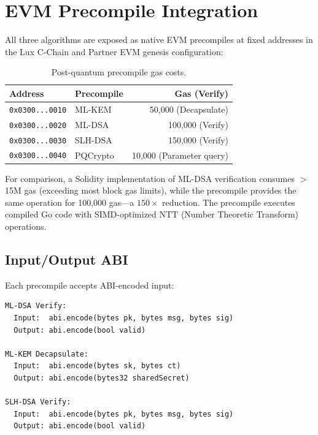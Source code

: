 \documentclass[11pt,a4paper]{article}
\begin{document}
\section{EVM Precompile Integration}
\label{sec:precompiles}

All three algorithms are exposed as native EVM precompiles at fixed
addresses in the Lux C-Chain and Partner EVM genesis configuration:

\begin{table}[h]
\centering
\begin{tabular}{llr}
\toprule
\textbf{Address} & \textbf{Precompile} & \textbf{Gas (Verify)} \\
\midrule
\texttt{0x0300...0010} & ML-KEM & 50,000 (Decapsulate) \\
\texttt{0x0300...0020} & ML-DSA & 100,000 (Verify) \\
\texttt{0x0300...0030} & SLH-DSA & 150,000 (Verify) \\
\texttt{0x0300...0040} & PQCrypto & 10,000 (Parameter query) \\
\bottomrule
\end{tabular}
\caption{Post-quantum precompile gas costs.}
\label{tab:gas}
\end{table}

For comparison, a Solidity implementation of ML-DSA verification
consumes $>$15M gas (exceeding most block gas limits), while the
precompile provides the same operation for 100,000 gas---a $150\times$
reduction.  The precompile executes compiled Go code with SIMD-optimized
NTT (Number Theoretic Transform) operations.

\subsection{Input/Output ABI}

Each precompile accepts ABI-encoded input:

\begin{verbatim}
ML-DSA Verify:
  Input:  abi.encode(bytes pk, bytes msg, bytes sig)
  Output: abi.encode(bool valid)

ML-KEM Decapsulate:
  Input:  abi.encode(bytes sk, bytes ct)
  Output: abi.encode(bytes32 sharedSecret)

SLH-DSA Verify:
  Input:  abi.encode(bytes pk, bytes msg, bytes sig)
  Output: abi.encode(bool valid)
\end{verbatim}
\end{document}
